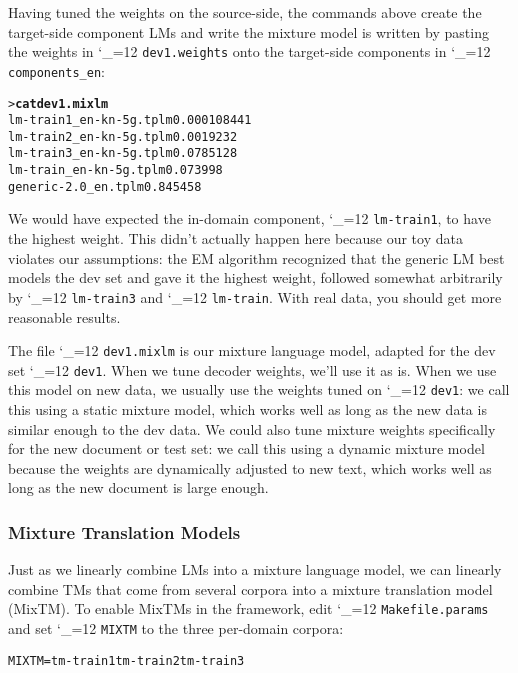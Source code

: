 \documentclass[11pt,letterpaper]{article}
\def\code{\begingroup\catcode`\_=12 \codex}
\newcommand{\codex}[1]{\texttt{#1}\endgroup}
\begin{document}
Having tuned the weights on the source-side, the commands above create the target-side component LMs
and write the mixture model is written by pasting the weights in
\code{dev1.weights} onto the target-side components in \code{components_en}:
\begin{small}
\begin{alltt}
   > \textbf{cat dev1.mixlm}
   lm-train1_en-kn-5g.tplm 0.000108441
   lm-train2_en-kn-5g.tplm 0.0019232
   lm-train3_en-kn-5g.tplm 0.0785128
   lm-train_en-kn-5g.tplm  0.073998
   generic-2.0_en.tplm     0.845458
\end{alltt}
\end{small}

We would have expected the in-domain component,
\code{lm-train1}, to have
the highest weight.  This didn't actually happen here because our toy data
violates our assumptions: the EM algorithm recognized that the generic LM best
models the dev set and gave it the highest weight, followed somewhat arbitrarily by
\code{lm-train3} and \code{lm-train}.  With real data,
you should get more reasonable results.

The file \code{dev1.mixlm} is our mixture language model, adapted for the
dev set \code{dev1}.  When we tune decoder weights, we'll use it as is.  When
we use this model on new data, we usually use the weights tuned on
\code{dev1}: we call this using a static mixture model, which works well as
long as the new data is similar enough to the dev data.  We could also tune
mixture weights specifically for the new document or test set: we call this
using a dynamic mixture model because the weights are dynamically adjusted to
new text, which works well as long as the new document is large enough.

\subsubsection{Mixture Translation Models} \label{MIXTM}

Just as we linearly combine LMs into a mixture language model, we can linearly
combine TMs that come from several corpora into a mixture translation model
(MixTM).  To enable MixTMs in the framework, edit \code{Makefile.params} and
set \code{MIXTM} to the three per-domain corpora:
\begin{small}
\begin{alltt}
   MIXTM = tm-train1 tm-train2 tm-train3
\end{alltt}
\end{small}
\end{document}
